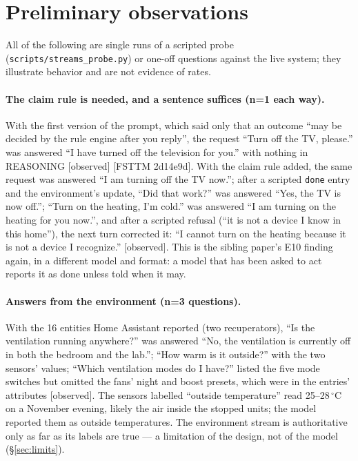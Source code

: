 \documentclass[11pt]{article}
\newcommand{\src}[1]{{\footnotesize\textsf{[#1]}}}
\newcommand{\observed}{\textsf{\small[observed]}}
\begin{document}
\section{Preliminary observations}\label{sec:obs}

All of the following are single runs of a scripted probe (\texttt{scripts/streams\_probe.py})
or one-off questions against the live system; they illustrate behavior and are not evidence
of rates.

\paragraph{The claim rule is needed, and a sentence suffices (n=1 each way).} With the first
version of the prompt, which said only that an outcome ``may be decided by the rule engine
after you reply'', the request ``Turn off the TV, please.'' was answered ``I have turned off
the television for you.'' with nothing in REASONING \observed{} \src{FSTTM 2d14e9d}. With the
claim rule added, the same request was answered ``I am turning off the TV now.''; after a
scripted \texttt{done} entry and the environment's update, ``Did that work?'' was answered
``Yes, the TV is now off.''; ``Turn on the heating, I'm cold.'' was answered ``I am turning on
the heating for you now.'', and after a scripted refusal (``it is not a device I know in this
home''), the next turn corrected it: ``I cannot turn on the heating because it is not a device
I recognize.'' \observed. This is the sibling paper's E10 finding again, in a different model
and format: a model that has been asked to act reports it as done unless told when it may.

\paragraph{Answers from the environment (n=3 questions).} With the 16 entities Home Assistant
reported (two recuperators), ``Is the ventilation running anywhere?'' was answered ``No, the
ventilation is currently off in both the bedroom and the lab.''; ``How warm is it outside?''
with the two sensors' values; ``Which ventilation modes do I have?'' listed the five mode
switches but omitted the fans' night and boost presets, which were in the entries' attributes
\observed. The sensors labelled ``outside temperature'' read 25--28\,$^\circ$C on a November
evening, likely the air inside the stopped units; the model reported them as outside
temperatures. The environment stream is authoritative only as far as its labels are true ---
a limitation of the design, not of the model (\S\ref{sec:limits}).
\end{document}
